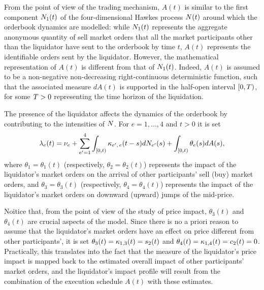 \documentclass[10pt, article,table]{article}
\begin{document}
From the point of view of the trading mechanism, $A(t)$ is similar to the first component $\countingProc[1](t)$ of the four-dimensional Hawkes process $\multiCountingProc(t)$ around which the orderbook dynamics are modelled: while $\countingProc[1](t)$ represents the aggregate anonymous quantity of sell market orders that all the market participants other than the liquidator have sent to the orderbook by time $t$, $A(t)$ represents the identifiable orders sent by the liquidator.  However, the mathematical representation of $A(t)$ is different from that of  $\countingProc[1](t)$. Indeed, $A(t)$ is assumed to be a non-negative non-decreasing right-continuous deterministic function, such that the associated measure $dA(t)$ is supported in the half-open interval $[0,\timeHorizon)$, for some $\timeHorizon>0$ representing the time horizon of the liquidation.

The presence of the liquidator affects the dynamics of the orderbook by contributing to the intensities of $\multiCountingProc$. For $e=1,\dots,4$ and $t>0$ it is set 
\begin{equation}\label{eq.BM14_intensity_with_liquidator}
 \intensity[e](t) = 
 \baseRate_e
 +\sum_{\eone=1}^{4}\int_{[0,t)} \hawkesKernel\subscriptee (t-s)d\countingProc[\eone](s) 
 + \int_{[0,t)} \theta_e(s)dA(s),
\end{equation}
where $\theta_1 = \theta_1(t)$ (respectively, $\theta_2=\theta_2(t)$) represents the impact of the liquidator's market orders on the arrival of other participants' sell (buy) market orders, and $\theta_3 = \theta_3(t)$ (respectively, $\theta_4 = \theta_4(t)$) represents the impact of the liquidator's market orders on downward (upward) jumps of the mid-price.

Noitice that, from the point of view of the study of price impact, $\theta_3(t)$ and $\theta_4(t)$ are crucial aspects of the model. Since there is no a priori reason to assume that the liquidator's market orders have an effect on price different from other participants', it is set $\theta_3(t) = \hawkesKernel_{1,3}(t) = s_2(t)$ and $\theta_4(t)=\hawkesKernel_{1,4}(t)=c_2(t)=0$. Practically, this translates into the fact that the measure of the liquidator's price impact is mapped back to the estimated overall impact of other participants' market orders, and the liquidator's impact profile will result from the combination of the execution schedule $A(t)$ with these estimates.
\end{document}
